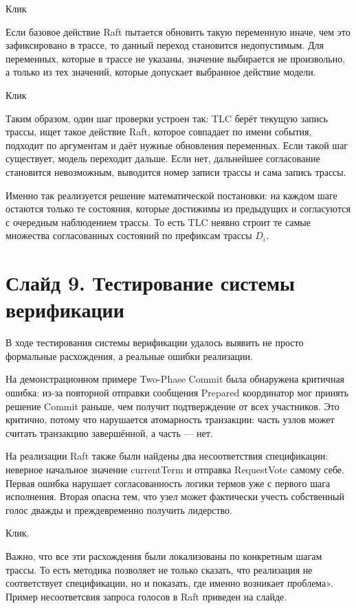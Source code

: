 \documentclass[12pt,a4paper]{article}
\begin{document}
Клик

Если базовое действие Raft пытается обновить такую переменную иначе, чем это
зафиксировано в трассе, то данный переход становится недопустимым. Для
переменных, которые в трассе не указаны, значение выбирается не произвольно, а
только из тех значений, которые допускает выбранное действие модели.

Клик

Таким образом, один шаг проверки устроен так:
TLC берёт текущую запись трассы, ищет такое действие Raft,
которое совпадает по имени события, подходит по аргументам и даёт
нужные обновления переменных.
Если такой шаг существует, модель переходит дальше.
Если нет, дальнейшее согласование становится невозможным, выводится номер
записи трассы и сама запись трассы.

Именно так реализуется решение математической постановки:
на каждом шаге остаются только те состояния, которые достижимы
из предыдущих и согласуются с очередным наблюдением трассы.
То есть TLC неявно строит те самые множества согласованных
состояний по префиксам трассы $D_i$.

\section*{Слайд 9. Тестирование системы верификации}

В ходе тестирования системы верификации удалось выявить не просто
формальные расхождения, а реальные ошибки реализации.

На демонстрационном примере Two-Phase Commit была обнаружена критичная
ошибка: из-за повторной отправки сообщения Prepared координатор мог
принять решение Commit раньше, чем получит подтверждение от всех
участников. Это критично, потому что нарушается атомарность транзакции:
часть узлов может считать транзакцию завершённой, а часть — нет.

На реализации Raft также были найдены два несоответствия спецификации:
неверное начальное значение currentTerm и отправка RequestVote
самому себе. Первая ошибка нарушает согласованность логики термов уже с
первого шага исполнения. Вторая опасна тем, что узел может фактически
учесть собственный голос дважды и преждевременно получить лидерство.

Клик.

Важно, что все эти расхождения были локализованы по конкретным шагам
трассы. То есть методика позволяет не только сказать, что реализация не
соответствует спецификации, но и показать, где именно возникает
проблема». Пример несоответсвия запроса голосов в Raft приведен на слайде.
\end{document}
